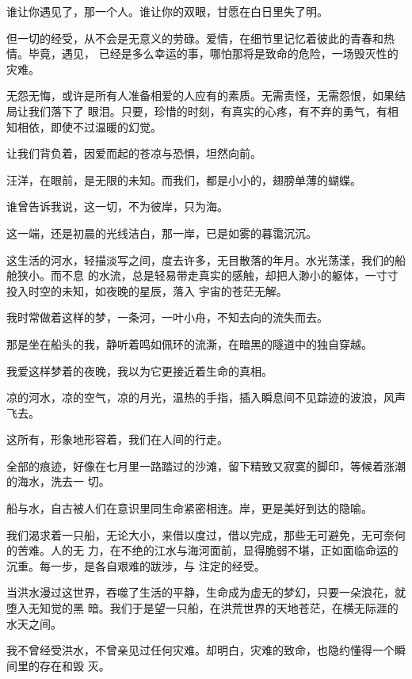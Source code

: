		谁让你遇见了，那一个人。谁让你的双眼，甘愿在白日里失了明。

		但一切的经受，从不会是无意义的劳碌。爱情，在细节里记忆着彼此的青春和热情。毕竟，遇见，
	已经是多么幸运的事，哪怕那将是致命的危险，一场毁灭性的灾难。


		无怨无悔，或许是所有人准备相爱的人应有的素质。无需责怪，无需怨恨，如果结局让我们落下了
	眼泪。只要，珍惜的时刻，有真实的心疼，有不弃的勇气，有相知相依，即使不过温暖的幻觉。

		让我们背负着，因爱而起的苍凉与恐惧，坦然向前。

		汪洋，在眼前，是无限的未知。而我们，都是小小的，翅膀单薄的蝴蝶。


		谁曾告诉我说，这一切，不为彼岸，只为海。

	\endwriting



		这一端，还是初晨的光线洁白，那一岸，已是如雾的暮霭沉沉。


		这生活的河水，轻描淡写之间，度去许多，无目散落的年月。水光荡漾，我们的船舱狭小。而不息
	的水流，总是轻易带走真实的感触，却把人渺小的躯体，一寸寸投入时空的未知，如夜晚的星辰，落入
	宇宙的苍茫无解。


		我时常做着这样的梦，一条河，一叶小舟，不知去向的流失而去。

		那是坐在船头的我，静听着鸣如佩环的流澌，在暗黑的隧道中的独自穿越。

		我爱这样梦着的夜晚，我以为它更接近着生命的真相。


		凉的河水，凉的空气，凉的月光，温热的手指，插入瞬息间不见踪迹的波浪，风声飞去。

		这所有，形象地形容着，我们在人间的行走。


		全部的痕迹，好像在七月里一路踏过的沙滩，留下精致又寂寞的脚印，等候着涨潮的海水，洗去一
	切。


		船与水，自古被人们在意识里同生命紧密相连。岸，更是美好到达的隐喻。

		我们渴求着一只船，无论大小，来借以度过，借以完成，那些无可避免，无可奈何的苦难。人的无
	力，在不绝的江水与海河面前，显得脆弱不堪，正如面临命运的沉重。每一步，是各自艰难的跋涉，与
	注定的经受。

		当洪水漫过这世界，吞噬了生活的平静，生命成为虚无的梦幻，只要一朵浪花，就堕入无知觉的黑
	暗。我们于是望一只船，在洪荒世界的天地苍茫，在横无际涯的水天之间。


		我不曾经受洪水，不曾亲见过任何灾难。却明白，灾难的致命，也隐约懂得一个瞬间里的存在和毁
	灭。

